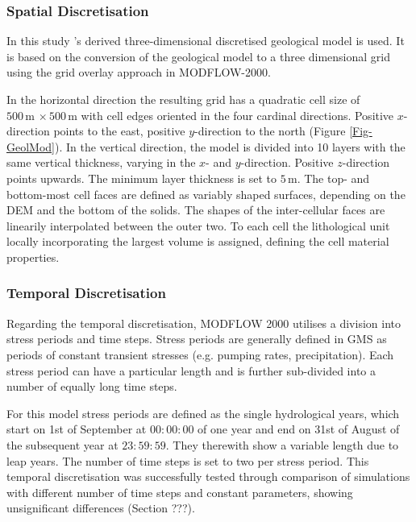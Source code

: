 \subsubsection{Spatial Discretisation}

In this study \textcite{Horn.2021}'s derived three-dimensional discretised geological model is used. 
It is based on the conversion of the geological model to a three dimensional grid using the grid overlay approach in MODFLOW-2000.

In the horizontal direction the resulting grid has a quadratic cell size of $500 \, \textrm{m} \, \times 500 \, \textrm{m}$ with cell edges oriented in the four cardinal directions. 
Positive $x$-direction points to the east, positive $y$-direction to the north (Figure \ref{Fig-GeolMod}). 
In the vertical direction, the model is divided into 10 layers with the same vertical thickness, varying in the $x$- and $y$-direction. 
Positive $z$-direction points upwards. 
The minimum layer thickness is set to $5 \, \textrm{m}$. 
The top- and bottom-most cell faces are defined as variably shaped surfaces, depending on the DEM and the bottom of the solids. 
The shapes of the inter-cellular faces are linearily interpolated between the outer two. 
To each cell the lithological unit locally incorporating the largest volume is assigned, defining the cell material properties.

\subsubsection{Temporal Discretisation}

Regarding the temporal discretisation, MODFLOW 2000 utilises a division into stress periods and time steps. 
Stress periods are generally defined in GMS as periods of constant transient stresses (e.g. pumping rates, precipitation). 
Each stress period can have a particular length and is further sub-divided into a number of equally long time steps.

For this model stress periods are defined as the single hydrological years, which start on 1st of September at ${00\!:\!00\!:\!00}$ of one year and end on 31st of August of the subsequent year at ${23\!:\!59\!:\!59}$. 
They therewith show a variable length due to leap years. 
The number of time steps is set to two per stress period. 
This temporal discretisation was successfully tested through comparison of simulations with different number of time steps and constant parameters, showing unsignificant differences (Section ???).


